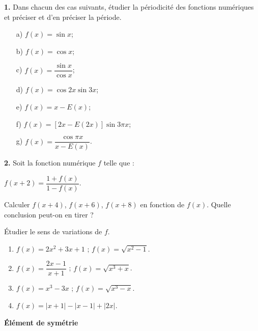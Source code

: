 \documentclass[12pt]{article}
\begin{document}
\bigskip

\textbf{1.} Dans chacun des cas suivants, étudier la périodicité des fonctions numériques et préciser et d’en préciser la période.

\begin{itemize}
    \item[a)] \( f(x) = \sin x \);
    \item[b)] \( f(x) = \cos x \);
    \item[c)] \( f(x) = \dfrac{\sin x}{\cos x} \);
    \item[d)] \( f(x) = \cos 2x \sin 3x \);
    \item[e)] \( f(x) = x - E(x) \);
    \item[f)] \( f(x) = [2x - E(2x)] \sin 3\pi x \);
    \item[g)] \( f(x) = \dfrac{\cos \pi x}{x - E(x)} \).
\end{itemize}

\bigskip

\textbf{2.} Soit la fonction numérique \( f \) telle que :

\( f(x + 2) = \dfrac{1 + f(x)}{1 - f(x)}. \)

Calculer \( f(x + 4) \), \( f(x + 6) \), \( f(x + 8) \) en fonction de \( f(x) \).  
Quelle conclusion peut-on en tirer ?

 \quad Étudier le sens de variations de \( f \).

\bigskip

\noindent
\begin{enumerate}
    \item \( f(x) = 2x^2 + 3x + 1 \) \quad ; \quad \( f(x) = \sqrt{x^2 - 1} \).
    \item \( f(x) = \dfrac{2x - 1}{x + 1} \) \quad ; \quad \( f(x) = \sqrt{x^3 + x} \).
    \item \( f(x) = x^3 - 3x \) \quad ; \quad \( f(x) = \sqrt{x^3 - x} \).
    \item \( f(x) = |x + 1| - |x - 1| + |2x| \).
\end{enumerate}

\bigskip

 \quad \textbf{Élément de symétrie}

\bigskip
\end{document}
